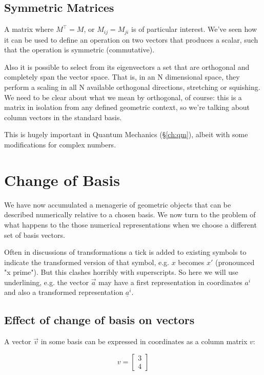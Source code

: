 \subsection{Symmetric Matrices}\label{ch:vectors-symmetric}

A matrix where $M^\intercal = M$, or $M_{ij} = M_{ji}$ is of particular interest. We've seen how it can be used to define an operation on two vectors that produces a scalar, such that the operation is symmetric (commutative).

Also it is possible to select from its eigenvectors a set that are orthogonal and completely span the vector space. That is, in an N dimensional space, they perform a scaling in all N available orthogonal directions, stretching or squishing. We need to be clear about what we mean by orthogonal, of course: this is a matrix in isolation from any defined geometric context, so we're talking about column vectors in the standard basis.

This is hugely important in Quantum Mechanics (§\ref{ch:qm}), albeit with some modifications for complex numbers.

\section{Change of Basis}\label{sec:vectors-change-basis}

We have now accumulated a menagerie of geometric objects that can be described numerically relative to a chosen basis. We now turn to the problem of what happens to the those numerical representations when we choose a different set of basis vectors.

Often in discussions of transformations a tick is added to existing symbols to indicate the transformed version of that symbol, e.g. $x$ becomes $x'$ (pronounced "x prime"). But this clashes horribly with superscripts. So here we will use underlining, e.g. the vector $\vec{a}$ may have a first representation in coordinates $a^i$ and also a transformed representation $\underline{a}^i$.

\subsection{Effect of change of basis on vectors}

A vector $\vec{v}$ in some basis can be expressed in coordinates as a column matrix $v$:

$$v = \begin{bmatrix}3 \\ 4\end{bmatrix}$$

